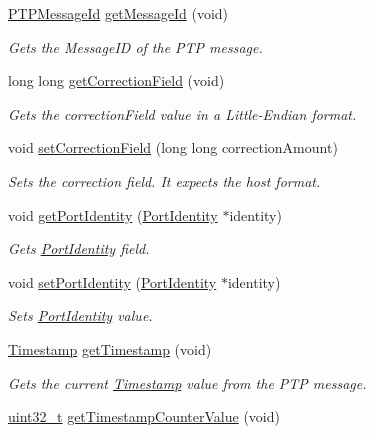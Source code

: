 \begin{DoxyCompactItemize}
\hyperlink{class_p_t_p_message_id}{P\+T\+P\+Message\+Id} \hyperlink{class_p_t_p_message_common_a5cd92d7e4383eedc84db3781940ba4e0}{get\+Message\+Id} (void)
\begin{DoxyCompactList}\small\item\em Gets the Message\+ID of the P\+TP message. \end{DoxyCompactList}\item 
long long \hyperlink{class_p_t_p_message_common_a9930feb44509700c6a81aa4e747357ca}{get\+Correction\+Field} (void)
\begin{DoxyCompactList}\small\item\em Gets the correction\+Field value in a Little-\/\+Endian format. \end{DoxyCompactList}\item 
void \hyperlink{class_p_t_p_message_common_acecb3e9987905070c3e9d089bae8e70d}{set\+Correction\+Field} (long long correction\+Amount)
\begin{DoxyCompactList}\small\item\em Sets the correction field. It expects the host format. \end{DoxyCompactList}\item 
void \hyperlink{class_p_t_p_message_common_a81caf27b0bcf771cb3c35d8fe42ae8ed}{get\+Port\+Identity} (\hyperlink{class_port_identity}{Port\+Identity} $\ast$identity)
\begin{DoxyCompactList}\small\item\em Gets \hyperlink{class_port_identity}{Port\+Identity} field. \end{DoxyCompactList}\item 
void \hyperlink{class_p_t_p_message_common_a94378ebb164e2095d3a17b393a63f2dc}{set\+Port\+Identity} (\hyperlink{class_port_identity}{Port\+Identity} $\ast$identity)
\begin{DoxyCompactList}\small\item\em Sets \hyperlink{class_port_identity}{Port\+Identity} value. \end{DoxyCompactList}\item 
\hyperlink{class_timestamp}{Timestamp} \hyperlink{class_p_t_p_message_common_a0bdaf174c565b4d10499011885dde906}{get\+Timestamp} (void)
\begin{DoxyCompactList}\small\item\em Gets the current \hyperlink{class_timestamp}{Timestamp} value from the P\+TP message. \end{DoxyCompactList}\item 
\hyperlink{parse_8c_a6eb1e68cc391dd753bc8ce896dbb8315}{uint32\+\_\+t} \hyperlink{class_p_t_p_message_common_a2f9298443285c8dd689acce23b59dc8f}{get\+Timestamp\+Counter\+Value} (void)

\end{DoxyCompactItemize}
